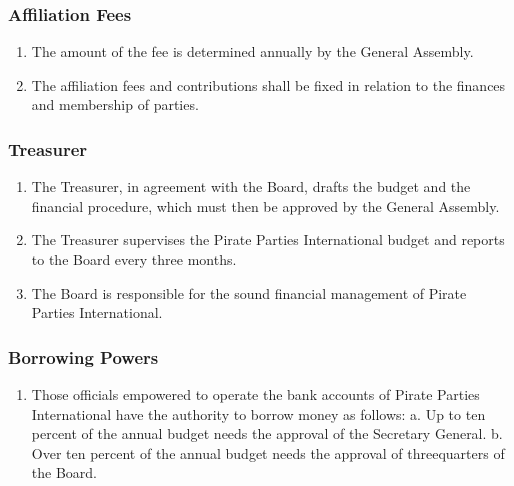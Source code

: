 \begin{frame}

\frametitle{Affiliation Fees}
\label{affiliationfees}

\begin{enumerate}
\item The amount of the fee is determined annually by the General Assembly.

\item The affiliation fees and contributions shall be fixed in relation to the finances and membership of parties.

\end{enumerate}

\end{frame}

\begin{frame}

\frametitle{Treasurer}
\label{treasurer}

\begin{enumerate}
\item The Treasurer, in agreement with the Board, drafts the budget and the financial procedure, which must then be approved by the General Assembly.

\item The Treasurer supervises the Pirate Parties International budget and reports to the Board every three months.

\item The Board is responsible for the sound financial management of Pirate Parties International.

\end{enumerate}

\end{frame}

\begin{frame}

\frametitle{Borrowing Powers}
\label{borrowingpowers}

\begin{enumerate}
\item Those officials empowered to operate the bank accounts of Pirate Parties International have the authority to borrow money as follows:
 a. Up to ten percent of the annual budget needs the approval of the Secretary General.
 b. Over ten percent of the annual budget needs the approval of threequarters of the Board.

\end{enumerate}

\end{frame}

